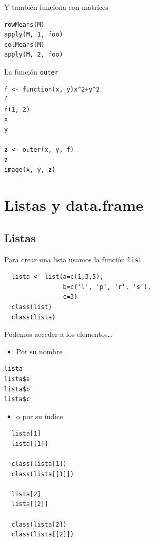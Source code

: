 \documentclass[xcolor={usenames,svgnames,dvipsnames}]{beamer}
\begin{document}
\begin{frame}[fragile,label=sec-3-2-2]{Y también funciona con matrices}
 \lstset{language=R,label= ,caption= ,numbers=none}
\begin{lstlisting}
rowMeans(M)
apply(M, 1, foo)
colMeans(M)
apply(M, 2, foo)
\end{lstlisting}
\end{frame}

\begin{frame}[fragile,label=sec-3-2-3]{La función \texttt{outer}}
 \lstset{language=R,label= ,caption= ,numbers=none}
\begin{lstlisting}
f <- function(x, y)x^2+y^2
f
f(1, 2)
x
y

z <- outer(x, y, f)
z
image(x, y, z)
\end{lstlisting}
\end{frame}


\section{Listas y data.frame}
\label{sec-4}

\subsection{Listas}
\label{sec-4-1}
\begin{frame}[fragile,label=sec-4-1-1]{Para crear una lista usamos la función \texttt{list}}
 \lstset{language=R,label= ,caption= ,numbers=none}
\begin{lstlisting}
  lista <- list(a=c(1,3,5),
                b=c('l', 'p', 'r', 's'),
                c=3)
  class(list)
  class(lista)
\end{lstlisting}
\end{frame}

\begin{frame}[fragile,label=sec-4-1-2]{Podemos acceder a los elementos\ldots{}}
 \begin{itemize}
\item Por su nombre
\end{itemize}
\lstset{language=R,label= ,caption= ,numbers=none}
\begin{lstlisting}
lista
lista$a
lista$b
lista$c
\end{lstlisting}

\begin{itemize}
\item o por su índice
\end{itemize}
\lstset{language=R,label= ,caption= ,numbers=none}
\begin{lstlisting}
  lista[1]
  lista[[1]]
  
  class(lista[1])
  class(lista[[1]])
  
  lista[2]
  lista[[2]]
  
  class(lista[2])
  class(lista[[2]])
\end{lstlisting}
\end{frame}
\end{document}
